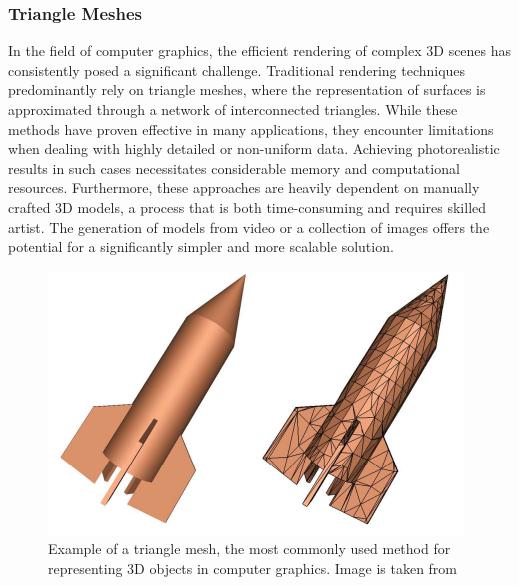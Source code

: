 \documentclass[12pt]{article}
\begin{document}
\subsubsection{Triangle Meshes}
In the field of computer graphics, the efficient rendering of complex 3D scenes has consistently posed a significant challenge. Traditional rendering techniques predominantly rely on triangle meshes, where the representation of surfaces is approximated through a network of interconnected triangles. While these methods have proven effective in many applications, they encounter limitations when dealing with highly detailed or non-uniform data. Achieving photorealistic results in such cases necessitates considerable memory and computational resources. Furthermore, these approaches are heavily dependent on manually crafted 3D models, a process that is both time-consuming and requires skilled artist. The generation of models from video or a collection of images offers the potential for a significantly simpler and more scalable solution.
\begin{figure}[h!]
	\centering
	\includegraphics[width=\textwidth]{Images/TriangleMesh.png}
	\caption{Example of a triangle mesh, the most commonly used method for representing 3D objects in computer graphics. Image is taken from \cite{Mesh}}
	\label{fig:trianglemesh}
\end{figure}
\newpage
\end{document}
